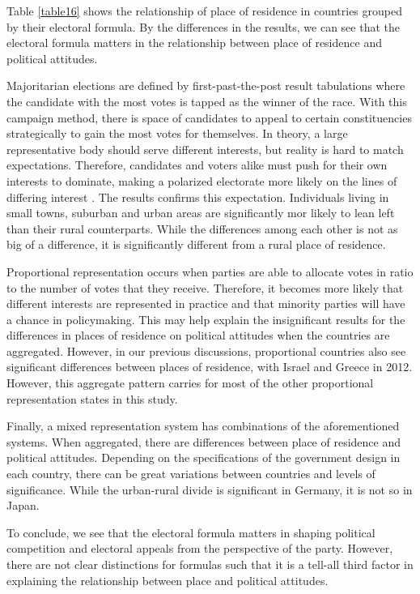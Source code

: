\documentclass[12pt, titlepage]{article}
\begin{document}
Table \ref{table16} shows the relationship of place of residence in countries grouped by their electoral formula. By the differences in the results, we can see that the electoral formula matters in the relationship between place of residence and political attitudes.

Majoritarian elections are defined by first-past-the-post result tabulations where the candidate with the most votes is tapped as the winner of the race. With this campaign method, there is space of candidates to appeal to certain constituencies strategically to gain the most votes for themselves. In theory, a large representative body should serve different interests, but reality is hard to match expectations. Therefore, candidates and voters alike must push for their own interests to dominate, making a polarized electorate more likely on the lines of differing interest \cite{abramowitz-2010}. The results confirms this expectation. Individuals living in small towns, suburban and urban areas are significantly mor likely to lean left than their rural counterparts. While the differences among each other is not as big of a difference, it is significantly different from a rural place of residence. 

Proportional representation occurs when parties are able to allocate votes in ratio to the number of votes that they receive. Therefore, it becomes more likely that different interests are represented in practice and that minority parties will have a chance in policymaking. This may help explain the insignificant results for the differences in places of residence on political attitudes when the countries are aggregated. However, in our previous discussions, proportional countries also see significant differences between places of residence, with Israel and Greece in 2012. However, this aggregate pattern carries for most of the other proportional representation states in this study.

Finally, a mixed representation system has combinations of the aforementioned systems. When aggregated, there are differences between place of residence and political attitudes. Depending on the specifications of the government design in each country, there can be great variations between countries and levels of significance. While the urban-rural divide is significant in Germany, it is not so in Japan. 

To conclude, we see that the electoral formula matters in shaping political competition and electoral appeals from the perspective of the party. However, there are not clear distinctions for formulas such that it is a tell-all third factor in explaining the relationship between place and political attitudes. 
\end{document}
